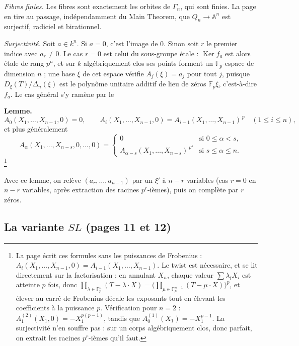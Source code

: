 \documentclass[11pt,a4paper]{article}
\begin{document}
\emph{Fibres finies.} Les fibres sont exactement les orbites de $\Gamma_n$,
qui sont finies. La page en tire au passage, indépendamment du Main Theorem,
que $Q_n \to \mathbb{A}^n$ est surjectif, radiciel et birationnel.

\emph{Surjectivité.} Soit $a \in k^n$. Si $a = 0$, c'est l'image de $0$.
Sinon soit $r$ le premier indice avec $a_r \neq 0$. Le cas $r = 0$ est celui
du sous-groupe étale : $\operatorname{Ker} f_a$ est alors étale de rang
$p^n$, et sur $k$ algébriquement clos ses points forment un
$\mathbb{F}_p$-espace de dimension $n$ ; une base $\xi$ de cet espace vérifie
$A_j(\xi) = a_j$ pour tout $j$, puisque $D_\xi(T)/\Delta_n(\xi)$ est le
polynôme unitaire additif de lieu de zéros $\mathbb{F}_p\xi$, c'est-à-dire
$f_a$. Le cas général s'y ramène par le

\textbf{Lemme.}
\[
  A_0(X_1, \dots, X_{n-1}, 0) = 0, \qquad
  A_i(X_1, \dots, X_{n-1}, 0) = A_{i-1}(X_1, \dots, X_{n-1})^{\,p}
  \quad (1 \leqslant i \leqslant n) ,
\]
et plus généralement
\[
  A_\alpha(X_1, \dots, X_{n-s}, 0, \dots, 0) =
  \begin{cases}
    0 & \text{si } 0 \leqslant \alpha < s, \\[2pt]
    A_{\alpha - s}(X_1, \dots, X_{n-s})^{\,p^s} & \text{si } s \leqslant \alpha \leqslant n .
  \end{cases}
\]
\footnote{La page écrit ces formules sans les puissances de Frobenius :
$A_i(X_1, \dots, X_{n-1}, 0) = A_{i-1}(X_1, \dots, X_{n-1})$. Le twist est
nécessaire, et se lit directement sur la factorisation : en annulant $X_n$,
chaque valeur $\sum \lambda_i X_i$ est atteinte $p$ fois, donc
$\prod_{\lambda \in \mathbb{F}_p^n}(T - \lambda \cdot X) =
\bigl(\prod_{\mu \in \mathbb{F}_p^{n-1}}(T - \mu \cdot X)\bigr)^p$, et
élever au carré de Frobenius décale les exposants tout en élevant les
coefficients à la puissance $p$. Vérification pour $n = 2$ :
$A_1^{(2)}(X_1, 0) = -X_1^{p(p-1)}$, tandis que $A_0^{(1)}(X_1) =
-X_1^{p-1}$. La surjectivité n'en souffre pas : sur un corps algébriquement
clos, donc parfait, on extrait les racines $p^r$-ièmes qu'il faut.}

Avec ce lemme, on relève $(a_r, \dots, a_{n-1})$ par un $\xi'$ à $n - r$
variables (cas $r = 0$ en $n - r$ variables, après extraction des racines
$p^r$-ièmes), puis on complète par $r$ zéros.

\subsection*{La variante $SL$ (pages 11 et 12)}
\end{document}
